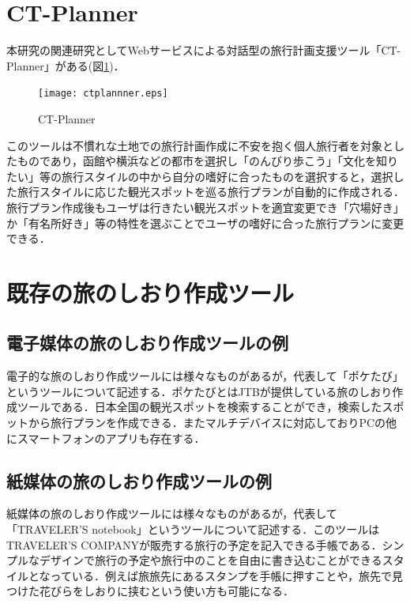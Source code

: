 \documentclass{funthesis}
\begin{document}
\section{CT-Planner}

本研究の関連研究としてWebサービスによる対話型の旅行計画支援ツール「CT-Planner」\cite{CTPlanner}がある(図\ref{LCT})．

\begin{figure}[htpb]
\begin{center}
\texttt{[image: ctplannner.eps]}
\end{center}
\caption{CT-Planner}
\label{LCT}
\end{figure}

このツールは不慣れな土地での旅行計画作成に不安を抱く個人旅行者を対象としたものであり，函館や横浜などの都市を選択し「のんびり歩こう」「文化を知りたい」等の旅行スタイルの中から自分の嗜好に合ったものを選択すると，選択した旅行スタイルに応じた観光スポットを巡る旅行プランが自動的に作成される．旅行プラン作成後もユーザは行きたい観光スポットを適宜変更でき「穴場好き」か「有名所好き」等の特性を選ぶことでユーザの嗜好に合った旅行プランに変更できる．


\section{既存の旅のしおり作成ツール}

\subsection{電子媒体の旅のしおり作成ツールの例}
電子的な旅のしおり作成ツールには様々なものがあるが，代表して「ポケたび」\cite{poketrip}というツールについて記述する．ポケたびとはJTBが提供している旅のしおり作成ツールである．日本全国の観光スポットを検索することができ，検索したスポットから旅行プランを作成できる．またマルチデバイスに対応しておりPCの他にスマートフォンのアプリも存在する．

\subsection{紙媒体の旅のしおり作成ツールの例}
紙媒体の旅のしおり作成ツールには様々なものがあるが，代表して「TRAVELER'S notebook」\cite{traver}というツールについて記述する．このツールはTRAVELER'S COMPANYが販売する旅行の予定を記入できる手帳である．シンプルなデザインで旅行の予定や旅行中のことを自由に書き込むことができるスタイルとなっている．例えば旅旅先にあるスタンプを手帳に押すことや，旅先で見つけた花びらをしおりに挟むという使い方も可能になる．
\end{document}
